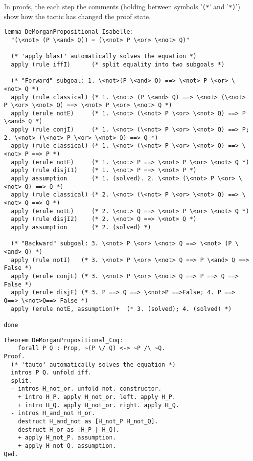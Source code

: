 \documentclass[article]{aaltoseries}
\begin{document}
In proofs, the  each step the comments (holding between symbols '\texttt{(*}' and '\texttt{*)}') show how the tactic has changed the proof state.
\begin{lstlisting}[language=isabelle, caption={Proof of the de Morgan's law for propositions in Isabelle}, label={ex_morgan_propos_isabelle}]
lemma DeMorganPropositional_Isabelle:
  "(\<not> (P \<and> Q)) = (\<not> P \<or> \<not> Q)"
  
  (* 'apply blast' automatically solves the equation *)
  apply (rule iffI)      (* split equality into two subgoals *)
  
  (* "Forward" subgoal: 1. \<not>(P \<and> Q) ==> \<not> P \<or> \<not> Q *)
  apply (rule classical) (* 1. \<not> (P \<and> Q) ==> \<not> (\<not> P \<or> \<not> Q) ==> \<not> P \<or> \<not> Q *)
  apply (erule notE)     (* 1. \<not> (\<not> P \<or> \<not> Q) ==> P \<and> Q *)
  apply (rule conjI)     (* 1. \<not> (\<not> P \<or> \<not> Q) ==> P; 2. \<not> (\<not> P \<or> \<not> Q) ==> Q *)
  apply (rule classical) (* 1. \<not> (\<not> P \<or> \<not> Q) ==> \<not> P ==> P *)
  apply (erule notE)     (* 1. \<not> P ==> \<not> P \<or> \<not> Q *)
  apply (rule disjI1)    (* 1. \<not> P ==> \<not> P *)
  apply assumption       (* 1. (solved). 2. \<not> (\<not> P \<or> \<not> Q) ==> Q *)
  apply (rule classical) (* 2. \<not> (\<not> P \<or> \<not> Q) ==> \<not> Q ==> Q *)
  apply (erule notE)     (* 2. \<not> Q ==> \<not> P \<or> \<not> Q *)
  apply (rule disjI2)    (* 2. \<not> Q ==> \<not> Q *)
  apply assumption       (* 2. (solved) *)
  
  (* "Backward" subgoal: 3. \<not> P \<or> \<not> Q ==> \<not> (P \<and> Q) *)
  apply (rule notI)   (* 3. \<not> P \<or> \<not> Q ==> P \<and> Q ==> False *)   
  apply (erule conjE) (* 3. \<not> P \<or> \<not> Q ==> P ==> Q ==> False *)
  apply (erule disjE) (* 3. P ==> Q ==> \<not>P ==>False; 4. P ==> Q==> \<not>Q==> False *)
  apply (erule notE, assumption)+  (* 3. (solved); 4. (solved) *)
  
done
\end{lstlisting}


    
\begin{lstlisting}[language=coq, caption={Proof of the de Morgan's law for propositions in Coq}, label={ex_morgan_propos_coq}]
Theorem DeMorganPropositional_Coq:
    forall P Q : Prop, ~(P \/ Q) <-> ~P /\ ~Q.  
Proof.
  (* 'tauto' automatically solves the equation *)
  intros P Q. unfold iff.
  split.
  - intros H_not_or. unfold not. constructor.
    + intro H_P. apply H_not_or. left. apply H_P.
    + intro H_Q. apply H_not_or. right. apply H_Q.
  - intros H_and_not H_or.
    destruct H_and_not as [H_not_P H_not_Q].
    destruct H_or as [H_P | H_Q].
    + apply H_not_P. assumption.
    + apply H_not_Q. assumption.
Qed.
\end{lstlisting}
\end{document}
